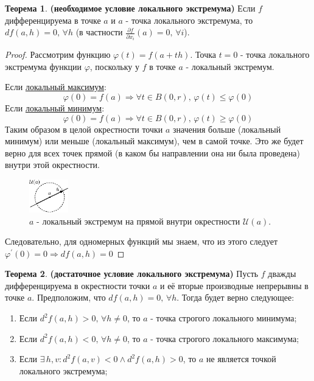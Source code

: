 \documentclass[12pt]{article}
\newcommand{\MU}{\mathcal{U}}
\theoremstyle{definition}
\newtheorem{theorem}{Теорема}
\begin{document}
\begin{theorem}\textbf{(необходимое условие локального экстремума)} Если $f$ дифференцируема в точке $a$ и $a$ - точка локального экстремума, то $df(a,h) = 0, \, \forall h$ (в частности $\tfrac{\partial f}{\partial x_i}(a) = 0, \, \forall i$).
\end{theorem}
\begin{proof}
	Рассмотрим функцию $\varphi(t) = f(a + th)$. Точка $t = 0$ - точка локального экстремума функции $\varphi$, поскольку у $f$ в точке $a$ - локальный экстремум.
	
	Если \uline{локальный максимум}:
	$$
		\varphi(0) = f(a) \Rightarrow \forall t \in B(0,r), \, \varphi(t) \leq \varphi(0) 	
	$$
	Если \uline{локальный минимум}:
	$$
		\varphi(0) = f(a) \Rightarrow \forall t \in B(0,r), \, \varphi(t) \geq \varphi(0) 	
	$$
	Таким образом в целой окрестности точки $a$ значения больше (локальный минимум) или меньше (локальный максимум), чем в самой точке. Это же будет верно для всех точек прямой (в каком бы направлении она ни была проведена) внутри этой окрестности. 
	\begin{figure}[H]
		\centering
		\includegraphics[width=0.15\textwidth]{18_2.eps}
		\caption{$a$ - локальный экстремум на прямой внутри окрестности $\MU(a)$.}
		\label{18_2}
	\end{figure}
	Следовательно, для одномерных функций мы знаем, что из этого следует $\varphi^\prime(0) = 0 \Rightarrow df(a,h) = 0$
\end{proof}
\begin{theorem}\textbf{(достаточное условие локального экстремума)}
	Пусть $f$ дважды дифференцируема в окрестности точки $a$ и её вторые производные непрерывны в точке $a$. Предположим, что $df(a,h) = 0, \, \forall h$. Тогда будет верно следующее:
	\begin{enumerate}[label ={(\arabic*)}]
		\item Если $d^2f(a,h) > 0, \, \forall h \neq 0$, то $a$ - точка строгого локального минимума;
		\item Если $d^2f(a,h) < 0, \, \forall h \neq 0$, то $a$ - точка строгого локального максимума;
		\item Если $\exists \, h,v \colon d^2f(a,v) < 0 \wedge d^2f(a,h) > 0$, то $a$ не является точкой локального экстремума; 
	\end{enumerate}
\end{theorem}
\end{document}
